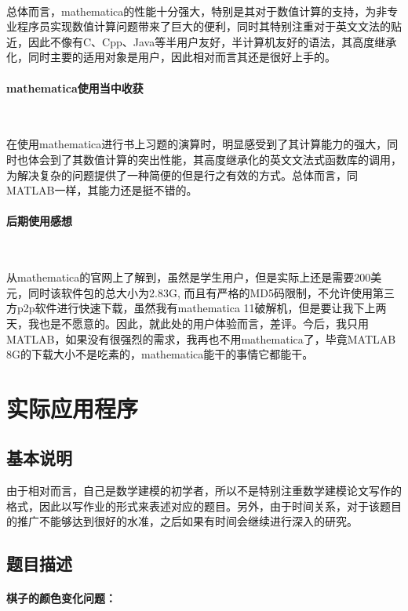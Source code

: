 \documentclass[UTF8]{ctexart}
\begin{document}
  ~

  总体而言，mathematica的性能十分强大，特别是其对于数值计算的支持，为非专业程序员实现数值计算问题带来了巨大的便利，同时其特别注重对于英文文法的贴近，因此不像有C、Cpp、Java等半用户友好，半计算机友好的语法，其高度继承化，同时主要的适用对象是用户，因此相对而言其还是很好上手的。

  \paragraph{mathematica使用当中收获}

  ~

  在使用mathematica进行书上习题的演算时，明显感受到了其计算能力的强大，同时也体会到了其数值计算的突出性能，其高度继承化的英文文法式函数库的调用，为解决复杂的问题提供了一种简便的但是行之有效的方式。总体而言，同MATLAB一样，其能力还是挺不错的。

  \paragraph{后期使用感想}
  
  ~

  从mathematica的官网上了解到，虽然是学生用户，但是实际上还是需要200美元，同时该软件包的总大小为2.83G, 而且有严格的MD5码限制，不允许使用第三方p2p软件进行快速下载，虽然我有mathematica 11破解机，但是要让我下上两天，我也是不愿意的。因此，就此处的用户体验而言，差评。今后，我只用MATLAB，如果没有很强烈的需求，我再也不用mathematica了，毕竟MATLAB 8G的下载大小不是吃素的，mathematica能干的事情它都能干。

  \section{实际应用程序}
  \subsection{基本说明}
  由于相对而言，自己是数学建模的初学者，所以不是特别注重数学建模论文写作的格式，因此以写作业的形式来表述对应的题目。另外，由于时间关系，对于该题目的推广不能够达到很好的水准，之后如果有时间会继续进行深入的研究。

  \subsection{题目描述}
  \paragraph{棋子的颜色变化问题：}
\end{document}

